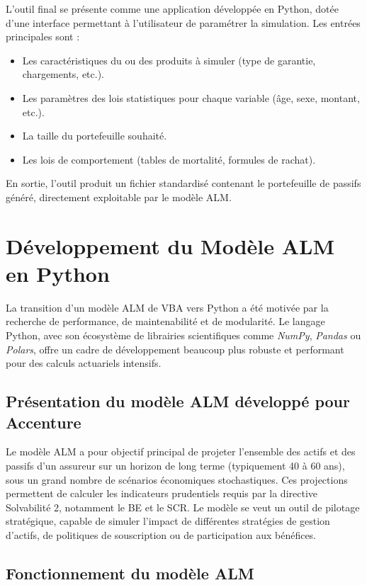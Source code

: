 L'outil final se présente comme une application développée en Python, dotée d'une interface permettant à l'utilisateur de paramétrer la simulation. Les entrées principales sont :
\begin{itemize}
    \item Les caractéristiques du ou des produits à simuler (type de garantie, chargements, etc.).
    \item Les paramètres des lois statistiques pour chaque variable (âge, sexe, montant, etc.).
    \item La taille du portefeuille souhaité.
    \item Les lois de comportement (tables de mortalité, formules de rachat).
\end{itemize}
En sortie, l'outil produit un fichier standardisé contenant le portefeuille de passifs généré, directement exploitable par le modèle ALM.

\section{Développement du Modèle ALM en Python}

La transition d'un modèle ALM de VBA vers Python a été motivée par la recherche de performance, de maintenabilité et de modularité. Le langage Python, avec son écosystème de librairies scientifiques comme \textit{NumPy}, \textit{Pandas} ou \textit{Polars}, offre un cadre de développement beaucoup plus robuste et performant pour des calculs actuariels intensifs.

\subsection{Présentation du modèle ALM développé pour Accenture}

Le modèle ALM a pour objectif principal de projeter l'ensemble des actifs et des passifs d'un assureur sur un horizon de long terme (typiquement 40 à 60 ans), sous un grand nombre de scénarios économiques stochastiques. Ces projections permettent de calculer les indicateurs prudentiels requis par la directive Solvabilité 2, notamment le BE et le SCR. Le modèle se veut un outil de pilotage stratégique, capable de simuler l'impact de différentes stratégies de gestion d'actifs, de politiques de souscription ou de participation aux bénéfices.

\subsection{Fonctionnement du modèle ALM}

